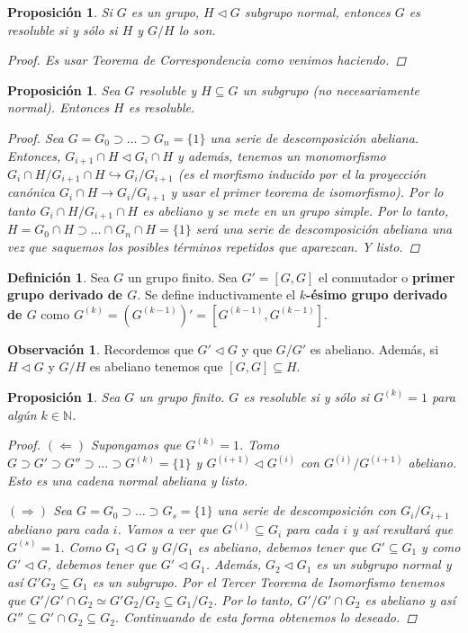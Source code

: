 \documentclass[12pt]{book}
\newtheorem{prop}[teo]{Proposición}
\theoremstyle{definition}
\newtheorem{obs}[teo]{Observación}
\newtheorem{defn}[teo]{Definición}
\newcommand{\NN}{\mathbb{N}}
\begin{document}
\begin{prop}
Si $G$ es un grupo, $H\triangleleft G$ subgrupo normal, entonces $G$ es resoluble si y sólo si $H$ y $G/H$ lo son.
\begin{proof}
Es usar Teorema de Correspondencia como venimos haciendo.
\end{proof}
\end{prop}

\begin{prop}
Sea $G$ resoluble y $H\subseteq G$ un subgrupo (no necesariamente normal). Entonces $H$ es resoluble.
\begin{proof}
Sea $G=G_0\supset\ldots\supset G_n=\{1\}$ una serie de descomposición abeliana. Entonces, $G_{i+1}\cap H\triangleleft G_i\cap H$ y además, tenemos un monomorfismo $G_i\cap H/G_{i+1}\cap H\hookrightarrow G_i/G_{i+1}$ (es el morfismo inducido por el la proyección canónica $G_i\cap H\to G_i/G_{i+1}$ y usar el primer teorema de isomorfismo). Por lo tanto $G_i\cap H/G_{i+1}\cap H$ es abeliano y se mete en un grupo simple. Por lo tanto, $H=G_0\cap H \supset\ldots \cap G_n\cap H = \{1\}$ será una serie de descomposición abeliana una vez que saquemos los posibles términos repetidos que aparezcan. Y listo.
\end{proof}
\end{prop}

\begin{defn}
Sea $G$ un grupo finito. Sea $G'=[G,G]$ el conmutador o \textbf{primer grupo derivado de $G$}. Se define inductivamente el \textbf{$k$-ésimo grupo derivado de $G$} como $G^{(k)} = (G^{(k-1)})' = [G^{(k-1)},G^{(k-1)}]$.
\end{defn}

\begin{obs}
Recordemos que $G'\triangleleft G$ y que $G/G'$ es abeliano. Además, si $H\triangleleft G$ y $G/H$ es abeliano tenemos que $[G,G]\subseteq H$.
\end{obs}

\begin{prop}
Sea $G$ un grupo finito. $G$ es resoluble si y sólo si $G^{(k)}=1$ para algún $k\in\NN$.
\begin{proof}
$(\Longleftarrow)$ Supongamos que $G^{(k)}=1$. Tomo $G\supset G' \supset G''\supset\ldots\supset G^{(k)}=\{1\}$ y $G^{(i+1)}\triangleleft G^{(i)}$ con $G^{(i)}/G^{(i+1)}$ abeliano. Esto es una cadena normal abeliana y listo.

$(\Longrightarrow)$ Sea $G=G_0\supset\ldots\supset G_s = \{1\}$ una serie de descomposición con $G_i/G_{i+1}$ abeliano para cada $i$. Vamos a ver que $G^{(i)}\subseteq G_i$ para cada $i$ y así resultará que $G^(s)=1$. Como $G_1\triangleleft G$ y $G/G_1$ es abeliano, debemos tener que $G'\subseteq G_1$ y como $G'\triangleleft G$, debemos tener que $G'\triangleleft G_1$. Además, $G_2\triangleleft G_1$ es un subgrupo normal y así $G'G_2\subseteq G_1$ es un subgrupo. Por el Tercer Teorema de Isomorfismo tenemos que $G'/G'\cap G_2\simeq G'G_2/G_2 \subseteq G_1/G_2$. Por lo tanto, $G'/G'\cap G_2$ es abeliano y así $G''\subseteq G'\cap G_2\subseteq G_2$. Continuando de esta forma obtenemos lo deseado.
\end{proof}
\end{prop}
\end{document}
